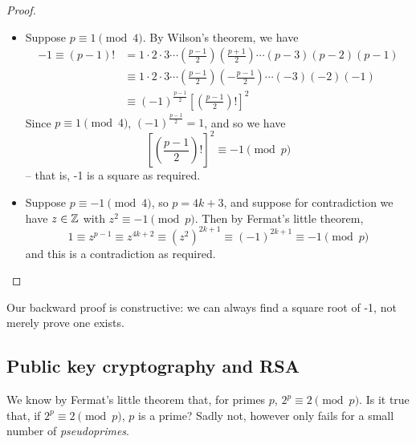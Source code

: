 \documentclass{../../template/note}
\begin{document}
    \begin{proof}
        \begin{itemize}
            \item[\(\impliedby\)] Suppose \(p \equiv 1 \pmod 4\). By Wilson's theorem, we have
            \begin{align*}
                -1 \equiv (p-1)! &= 1 \cdot 2 \cdot 3 \cdots \left(\frac{p-1}{2}\right) \left(\frac{p+1}{2}\right)\cdots (p-3)(p-2)(p-1) \\
                &\equiv 1 \cdot 2 \cdot 3 \cdots \left(\frac{p-1}{2}\right) \left(-\frac{p-1}{2}\right)\cdots (-3)(-2)(-1) \\
                &\equiv (-1)^\frac{p-1}{2} \left[\left(\frac{p-1}{2}\right)!\right]^2
            \end{align*}
            Since \(p \equiv 1 \pmod 4\), \((-1)^\frac{p-1}{2} = 1\), and so we have
            \[
                \left[\left(\frac{p-1}{2}\right)!\right]^2 \equiv -1 \pmod p
            \]
            -- that is, -1 is a square as required.
            \item[\(\implies\)] Suppose \(p \equiv -1 \pmod 4\), so \(p = 4k + 3\), and suppose for contradiction we have \(z \in \mathbb Z\) with \(z^2 \equiv -1 \pmod p\). Then by Fermat's little theorem,
            \[
                1 \equiv z^{p-1} \equiv z^{4k + 2} \equiv (z^2)^{2k+1} \equiv (-1)^{2k+1} \equiv -1 \pmod p
            \]
            and this is a contradiction as required.
        \end{itemize}
    \end{proof}
    
    \begin{remark*}
        Our backward proof is constructive: we can always find a square root of -1, not merely prove one exists.
    \end{remark*}
    
    \subsection{Public key cryptography and RSA}

    We know by Fermat's little theorem that, for primes \(p\), \(2^p \equiv 2 \pmod p\). Is it true that, if \(2^p \equiv 2 \pmod p\), \(p\) is a prime? Sadly not, however only fails for a small number of \emph{pseudoprimes}.
\end{document}
